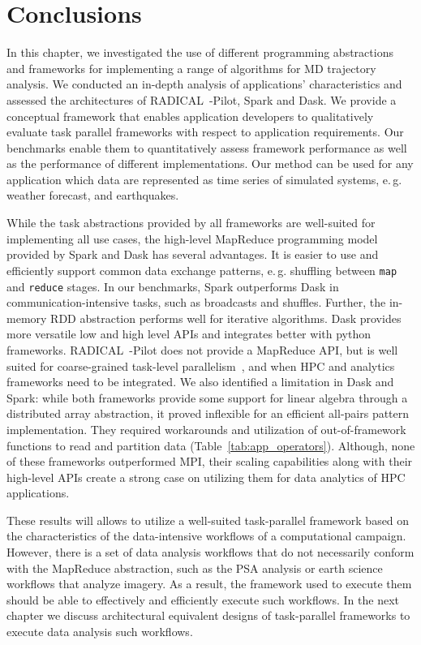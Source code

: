 \section{Conclusions}
In this chapter, we investigated the use of different programming abstractions and frameworks for implementing a range of algorithms for MD trajectory analysis. 
We conducted an in-depth analysis of applications' characteristics and assessed the architectures of RADICAL~-Pilot, Spark and Dask. 
We provide a conceptual framework that enables application developers to qualitatively evaluate task parallel frameworks with respect to application requirements. 
Our benchmarks enable them to quantitatively assess framework performance as well as the performance of different implementations. 
Our method can be used for any application which data are represented as time series of simulated systems, e.\,g. weather forecast, and earthquakes.

While the task abstractions provided by all frameworks are well-suited for implementing all use cases, the high-level MapReduce programming model provided by Spark and Dask has several advantages. 
It is easier to use and efficiently support common data exchange patterns, e.\,g. shuffling between \texttt{map} and \texttt{reduce} stages. 
In our benchmarks, Spark outperforms Dask in communication-intensive tasks, such as broadcasts and shuffles. 
Further, the in-memory RDD abstraction performs well for iterative algorithms. 
Dask provides more versatile low and high level APIs and integrates better with python frameworks. 
RADICAL~-Pilot does not provide a MapReduce API, but is well suited for coarse-grained task-level parallelism~\cite{merzky2018design, merzky2019using}, and when HPC and analytics frameworks need to be integrated. 
We also identified a limitation in Dask and Spark: while both frameworks provide some support for linear algebra through a distributed array abstraction, it proved inflexible for an efficient all-pairs pattern implementation. 
They required workarounds and utilization of out-of-framework functions to read and partition data (Table~\ref{tab:app_operators}). 
Although, none of these frameworks outperformed MPI, their scaling capabilities along with their high-level APIs create a strong case on utilizing them for data analytics of HPC applications.

These results will allows to utilize a well-suited task-parallel framework based on the characteristics of the data-intensive workflows of a computational campaign.
However, there is a set of data analysis workflows that do not necessarily conform with the MapReduce abstraction, such as the PSA analysis or earth science workflows that analyze imagery.
As a result, the framework used to execute them should be able to effectively and efficiently execute such workflows.
In the next chapter we discuss architectural equivalent designs of task-parallel frameworks to execute data analysis such workflows.

